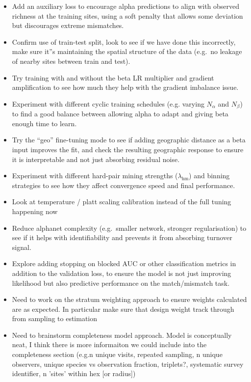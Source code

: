 \documentclass{article}
\begin{document}
\begin{itemize}
    \item Add an auxiliary loss to encourage alpha predictions to align with observed richness at the training sites, using a soft penalty that allows some deviation but discourages extreme mismatches.
    \item Confirm use of train-test split, look to see if we have done this incorrectly, make sure it''s maintaining the spatial structure of the data (e.g.\ no leakage of nearby sites between train and test).
    \item Try training with and without the beta LR multiplier and gradient amplification to see how much they help with the gradient imbalance issue.
    \item Experiment with different cyclic training schedules (e.g. varying $N_\alpha$ and $N_\beta$) to find a good balance between allowing alpha to adapt and giving beta enough time to learn.
    \item Try the ``geo'' fine-tuning mode to see if adding geographic distance as a beta input improves the fit, and check the resulting geographic response to ensure it is interpretable and not just absorbing residual noise.
    \item Experiment with different hard-pair mining strengths ($\lambda_{\text{hm}}$) and binning strategies to see how they affect convergence speed and final performance.
    \item Look at temperature / platt scaling calibration instead of the full tuning happening now
    \item Reduce alphanet complexity (e.g.\ smaller network, stronger regularisation) to see if it helps with identifiability and prevents it from absorbing turnover signal.
    \item Explore adding stopping on blocked AUC or other classification metrics in addition to the validation loss, to ensure the model is not just improving likelihood but also predictive performance on the match/mismatch task.
    \item Need to work on the stratum weighting approach to ensure weights calculated are as expected. In particular make sure that design weight track through from sampling to estimation
    \item Need to brainstorm completeness model approach. Model is conceptually neat, I think there is more informaiton we could include into the completeness section (e.g.n unique visits, repeated sampling, n unique observers, unique species vs observation fraction, triplets?, systematic survey identifier, n 'sites' within hex [or radius])

\end{itemize}
\end{document}
